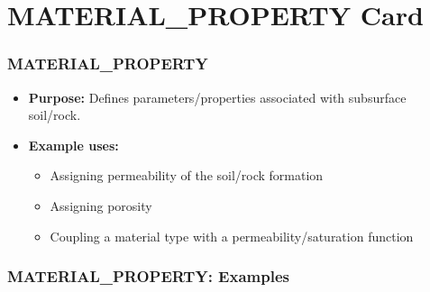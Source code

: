 \section{MATERIAL\_PROPERTY Card}

\begin{frame}\frametitle{MATERIAL\_PROPERTY}

\begin{itemize}
\item[] \textbf{Purpose:} Defines parameters/properties associated with subsurface soil/rock.
\item[] \textbf{Example uses:}
\begin{itemize}
  \item Assigning permeability of the soil/rock formation
  \item Assigning porosity
  \item Coupling a material type with a permeability/saturation function
\end{itemize}
\end{itemize}

\end{frame}

\begin{frame}[fragile]\frametitle{MATERIAL\_PROPERTY: Examples}

\end{frame}
